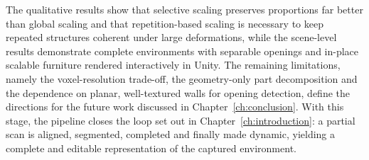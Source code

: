 The qualitative results show that selective scaling preserves proportions far better than global scaling and that repetition-based scaling is necessary to keep repeated structures coherent under large deformations, while the scene-level results demonstrate complete environments with separable openings and in-place scalable furniture rendered interactively in Unity. The remaining limitations, namely the voxel-resolution trade-off, the geometry-only part decomposition and the dependence on planar, well-textured walls for opening detection, define the directions for the future work discussed in Chapter~\ref{ch:conclusion}. With this stage, the pipeline closes the loop set out in Chapter~\ref{ch:introduction}: a partial scan is aligned, segmented, completed and finally made dynamic, yielding a complete and editable representation of the captured environment.


\cleardoublepage